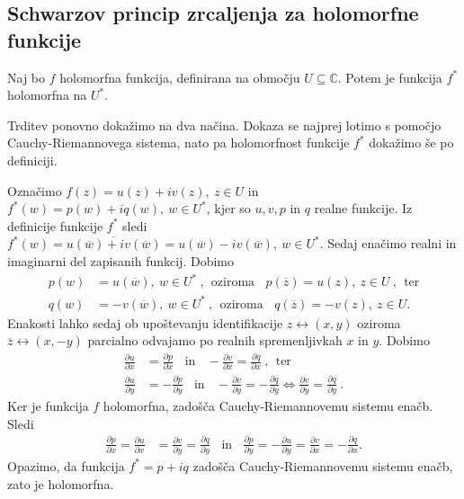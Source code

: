 \documentclass[mat1, tisk]{fmfdelo}
\begin{document}
\subsection{Schwarzov princip zrcaljenja za holomorfne funkcije}
    \begin{trditev}
        \label{lemahol}
        Naj bo $f$ holomorfna funkcija, definirana na območju $U \subseteq \mathbb{C}$.
        Potem je funkcija $f^*$ holomorfna na $U^*$.
    \end{trditev}
    \begin{dokaz}
        Trditev ponovno dokažimo na dva načina. Dokaza se najprej lotimo s pomočjo Cauchy-Riemannovega sistema, nato pa holomorfnost funkcije $f^*$ dokažimo še po definiciji.

        Označimo $f(z) = u(z) + iv(z),~ z \in U$ in $f^*(w) = p(w) + iq(w),~w \in U^*$, kjer so $u,v, p$ in $q$ realne funkcije. 
        Iz definicije funkcije $f^*$ sledi $f^*(w) = \overline{u(\overline{w}) + iv(\overline{w})} = u(\overline{w}) - iv(\overline{w}),~ w \in U^*$. 
        Sedaj enačimo realni in imaginarni del zapisanih funkcij. Dobimo
        \begin{align*}
            p(w) &= u(\overline{w}),~w \in U^*~,~~\text{oziroma}~~~~p(\overline{z}) = u(z),~z \in U~,~~\text{ter} \\
            q(w) &= -v(\overline{w}),~w \in U^*~,~~\text{oziroma}~~~~q(\overline{z}) = -v(z),~z \in U.
        \end{align*}
        Enakosti lahko sedaj ob upoštevanju identifikacije $z \leftrightarrow (x,y)$ oziroma $\overline{z} \leftrightarrow (x, -y)$ parcialno odvajamo po realnih spremenljivkah $x$ in $y$. Dobimo
        \begin{align*}
            \frac{\partial u}{\partial x} &= \frac{\partial p}{\partial x}~~~~\text{in}~~~~ -\frac{\partial v}{\partial x} = \frac{\partial q}{\partial x}~,~~\text{ter}\\
            \frac{\partial u}{\partial y} &=  - \frac{\partial p}{\partial y}~~~~\text{in}~~~~ -\frac{\partial v}{\partial y} = - \frac{\partial q}{\partial y} \iff \frac{\partial v}{\partial y} = \frac{\partial q}{\partial y}~.      
        \end{align*}
        Ker je funkcija $f$ holomorfna, zadošča Cauchy-Riemannovemu sistemu enačb.  
        Sledi
        \begin{align*}
            \frac{\partial p}{\partial x} = \frac{\partial u}{\partial x} &= \frac{\partial v}{\partial y} = \frac{\partial q}{\partial y}~~~~\text{in}~~~~ \frac{\partial p}{\partial y} = -\frac{\partial u}{\partial y} = \frac{\partial v}{\partial x} = -\frac{\partial q}{\partial x}.
        \end{align*}
        Opazimo, da funkcija $f^* = p + iq$ zadošča Cauchy-Riemannovemu sistemu enačb, zato je holomorfna.


\end{dokaz}
\end{document}
